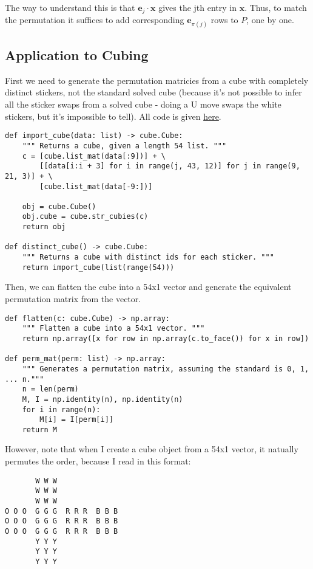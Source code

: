 \documentclass[11pt, oneside]{article}
\newcommand{\ve}[1]{\mathbf{#1}}
\begin{document}
The way to understand this is that \( \ve{e}_j \cdot \ve{x} \) gives the
jth entry in \( \ve{x} \). Thus, to match the permutation it suffices to
add corresponding \( \ve{e}_{\pi(j)} \) rows to \( P \), one by one.

\subsection{Application to Cubing}

First we need to generate the permutation matricies from a cube with completely
distinct stickers, not the standard solved cube (because it's not possible to infer
all the sticker swaps from a solved cube - doing a U move swaps the white stickers,
but it's impossible to tell). All code is given \href{https://github.com/stephen-huan/Cube-Solver/blob/master/linear.py}{here}.

\begin{verbatim}
def import_cube(data: list) -> cube.Cube:
    """ Returns a cube, given a length 54 list. """
    c = [cube.list_mat(data[:9])] + \
        [[data[i:i + 3] for i in range(j, 43, 12)] for j in range(9, 21, 3)] + \
        [cube.list_mat(data[-9:])]

    obj = cube.Cube()
    obj.cube = cube.str_cubies(c)
    return obj

def distinct_cube() -> cube.Cube:
    """ Returns a cube with distinct ids for each sticker. """
    return import_cube(list(range(54)))
\end{verbatim}

Then, we can flatten the cube into a 54x1 vector and generate the equivalent
permutation matrix from the vector.

\begin{verbatim}
def flatten(c: cube.Cube) -> np.array:
    """ Flatten a cube into a 54x1 vector. """
    return np.array([x for row in np.array(c.to_face()) for x in row])

def perm_mat(perm: list) -> np.array:
    """ Generates a permutation matrix, assuming the standard is 0, 1, ... n."""
    n = len(perm)
    M, I = np.identity(n), np.identity(n)
    for i in range(n):
        M[i] = I[perm[i]]
    return M
\end{verbatim}

However, note that when I create a cube object from a 54x1 vector,
it natually permutes the order, because I read in this format:
\begin{verbatim}
       W W W
       W W W
       W W W
O O O  G G G  R R R  B B B
O O O  G G G  R R R  B B B
O O O  G G G  R R R  B B B
       Y Y Y
       Y Y Y
       Y Y Y
\end{verbatim}
\end{document}
